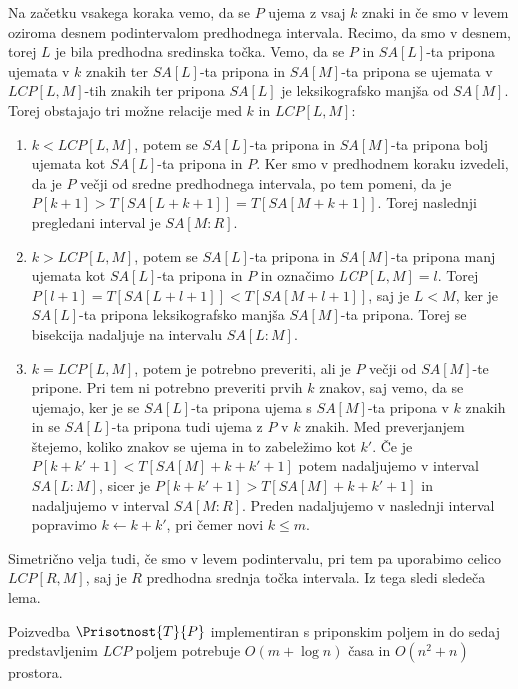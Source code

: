 Na začetku vsakega koraka vemo, da se $P$ ujema z vsaj $k$ znaki in če smo v levem oziroma desnem podintervalom predhodnega intervala. Recimo, da smo v desnem, torej $L$ je bila predhodna sredinska točka. Vemo, da se $P$ in $SA[L]$-ta pripona ujemata v $k$ znakih ter $SA[L]$-ta pripona in $SA[M]$-ta pripona se ujemata v $LCP[L,M]$-tih znakih ter pripona $SA[L]$ je leksikografsko manjša od $SA[M]$. Torej obstajajo tri možne relacije med $k$ in $LCP[L,M]$:
\begin{enumerate}
    \item $k<LCP[L,M]$, potem se $SA[L]$-ta pripona in $SA[M]$-ta pripona bolj ujemata kot $SA[L]$-ta pripona in $P$. Ker smo v predhodnem koraku izvedeli, da je $P$ večji od sredne predhodnega intervala, po tem pomeni, da je $P[k+1]>T[SA[L+k+1]]=T[SA[M+k+1]]$. Torej naslednji pregledani interval je $SA[M:R]$.
    \item $k>LCP[L,M]$, potem se $SA[L]$-ta pripona in $SA[M]$-ta pripona manj ujemata kot $SA[L]$-ta pripona in $P$ in označimo \textit{LCP}$[L,M]=l$. Torej $P[l+1]=T[SA[L+l+1]]<T[SA[M+l+1]]$, saj je $L<M$, ker je $SA[L]$-ta pripona leksikografsko manjša $SA[M]$-ta pripona. Torej se bisekcija nadaljuje na intervalu $SA[L:M]$.
    \item $k=LCP[L,M]$, potem je potrebno preveriti, ali je $P$ večji od $SA[M]$-te pripone. Pri tem ni potrebno preveriti prvih $k$ znakov, saj vemo, da se ujemajo, ker je se $SA[L]$-ta pripona ujema s $SA[M]$-ta pripona v $k$ znakih in se $SA[L]$-ta pripona tudi ujema z $P$ v $k$ znakih. Med preverjanjem štejemo, koliko znakov se ujema in to zabeležimo kot $k'$. Če je $P[k+k'+1]<T[SA[M]+k+k'+1]$ potem nadaljujemo v interval $SA[L:M]$, sicer je $P[k+k'+1]>T[SA[M]+k+k'+1]$ in nadaljujemo v interval $SA[M:R]$. Preden nadaljujemo v naslednji interval popravimo $k\leftarrow k+k'$, pri čemer novi $k\le m$.
\end{enumerate}
Simetrično velja tudi, če smo v levem podintervalu, pri tem pa uporabimo celico $LCP[R,M]$, saj je $R$ predhodna srednja točka intervala. Iz tega sledi sledeča lema.


\begin{lema}\label{lema:LCPKvadrat}
    Poizvedba $\Prisotnost{T}{P}$ implementiran s priponskim poljem in do sedaj predstavljenim $LCP$ poljem potrebuje $O(m+\log{n})$ časa in $O(n^2 +n)$ prostora.
\end{lema}


